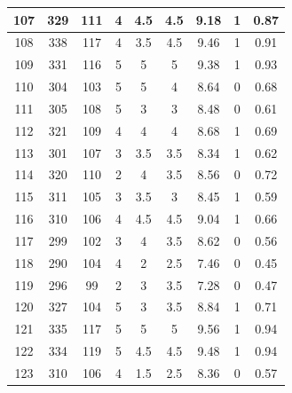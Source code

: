 \documentclass[11pt]{article}
\begin{document}
\begin{appendix}
\begin{longtable}[H]{|c|c|c|c|c|c|c|c|c|}
	107        & 329       & 111         & 4                 & 4.5 & 4.5 & 9.18 & 1        & 0.87            \\ \hline
	108        & 338       & 117         & 4                 & 3.5 & 4.5 & 9.46 & 1        & 0.91            \\ \hline
	109        & 331       & 116         & 5                 & 5   & 5   & 9.38 & 1        & 0.93            \\ \hline
	110        & 304       & 103         & 5                 & 5   & 4   & 8.64 & 0        & 0.68            \\ \hline
	111        & 305       & 108         & 5                 & 3   & 3   & 8.48 & 0        & 0.61            \\ \hline
	112        & 321       & 109         & 4                 & 4   & 4   & 8.68 & 1        & 0.69            \\ \hline
	113        & 301       & 107         & 3                 & 3.5 & 3.5 & 8.34 & 1        & 0.62            \\ \hline
	114        & 320       & 110         & 2                 & 4   & 3.5 & 8.56 & 0        & 0.72            \\ \hline
	115        & 311       & 105         & 3                 & 3.5 & 3   & 8.45 & 1        & 0.59            \\ \hline
	116        & 310       & 106         & 4                 & 4.5 & 4.5 & 9.04 & 1        & 0.66            \\ \hline
	117        & 299       & 102         & 3                 & 4   & 3.5 & 8.62 & 0        & 0.56            \\ \hline
	118        & 290       & 104         & 4                 & 2   & 2.5 & 7.46 & 0        & 0.45            \\ \hline
	119        & 296       & 99          & 2                 & 3   & 3.5 & 7.28 & 0        & 0.47            \\ \hline
	120        & 327       & 104         & 5                 & 3   & 3.5 & 8.84 & 1        & 0.71            \\ \hline
	121        & 335       & 117         & 5                 & 5   & 5   & 9.56 & 1        & 0.94            \\ \hline
	122        & 334       & 119         & 5                 & 4.5 & 4.5 & 9.48 & 1        & 0.94            \\ \hline
	123        & 310       & 106         & 4                 & 1.5 & 2.5 & 8.36 & 0        & 0.57            \\ \hline

\end{longtable}
\end{appendix}
\end{document}
